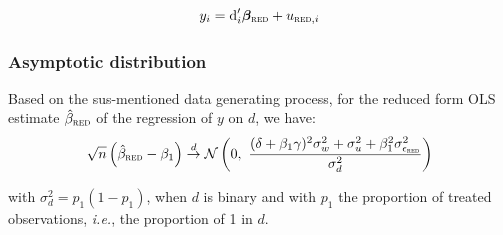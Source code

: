 \documentclass[a4paper, 11pt]{report}
\begin{document}
				\begin{equation}
					y_{i} =  \text{d}_{i}'\bm{\beta_{\textsc{red}}} + u_{\textsc{red}, i}
				\end{equation}

		
			\subsubsection{Asymptotic distribution}
		
			\begin{lemma}\label{lemma_red}
				Based on the sus-mentioned data generating process, for the reduced form OLS estimate $\hat{\beta}_{\textsc{red}}$ of the regression of $y$ on $d$, we have:
				\[
						\sqrt{n}\left( \hat{\beta}_{\textsc{red}} - \beta_{1} \right)
						\overset{d}{\to}
							 \mathcal{N}\left( 0 , \ \dfrac{(\delta + \beta_{1}\gamma)^{2} \sigma_{w}^{2} + \sigma_{u}^{2} + \beta_{1}^{2}\sigma_{\epsilon_{\textsc{red}}}^{2}}{\sigma_{d}^{2}} \right) 
				\]
				
				with $\sigma_{d}^{2} = p_{1}(1-p_{1})$, when $d$ is binary and with $p_{1}$ the proportion of treated observations, \textit{i.e.}, the proportion of 1 in $d$.		
				
			\end{lemma}
			
\end{document}
